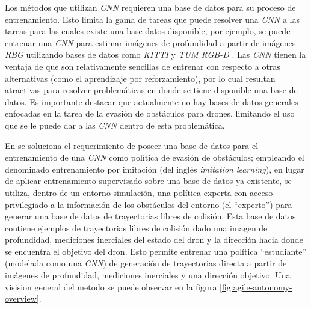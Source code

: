     \par Los métodos que utilizan \textit{CNN} requieren una base de datos para su proceso de entrenamiento. Esto limita la gama de tareas que puede resolver una \textit{CNN} a las tareas para las cuales existe una base datos disponible, por ejemplo, se puede entrenar una \textit{CNN} para estimar imágenes de profundidad a partir de imágenes \textit{RBG} utilizando bases de datos como \textit{KITTI} \cite{Geiger2013} y \textit{TUM RGB-D} \cite{Sturm2012}. Las \textit{CNN} tienen la ventaja de que son relativamente sencillas de entrenar con respecto a otras alternativas (como el aprendizaje por reforzamiento), por lo cual resultan atractivas para resolver problemáticas en donde se tiene disponible una base de datos. Es importante destacar que actualmente no hay bases de datos generales enfocadas en la tarea de la evasión de obstáculos para drones, limitando el uso que se le puede dar a las \textit{CNN} dentro de esta problemática. 
    
    \par En \cite{Loquercio2021} se soluciona el requerimiento de poseer una base de datos para el entrenamiento de una \textit{CNN} como política de evasión de obstáculos; empleando el denominado entrenamiento por imitación (del inglés \textit{imitation learning}), en lugar de aplicar entrenamiento supervisado sobre una base de datos ya existente, se utiliza, dentro de un entorno simulación, una política experta con acceso privilegiado a la información de los obstáculos del entorno (el ``experto'') para generar una base de datos de trayectorias libres de colisión. Esta base de datos contiene ejemplos de trayectorias libres de colisión dado una imagen de profundidad, mediciones inerciales del estado del dron y la dirección hacia donde se encuentra el objetivo del dron. Esto permite entrenar una política ``estudiante'' (modelada como una \textit{CNN}) de generación de trayectorias directa a partir de imágenes de profundidad, mediciones inerciales y una dirección objetivo. Una visision general del metodo se puede observar en la figura \ref{fig:agile-autonomy-overview}.

